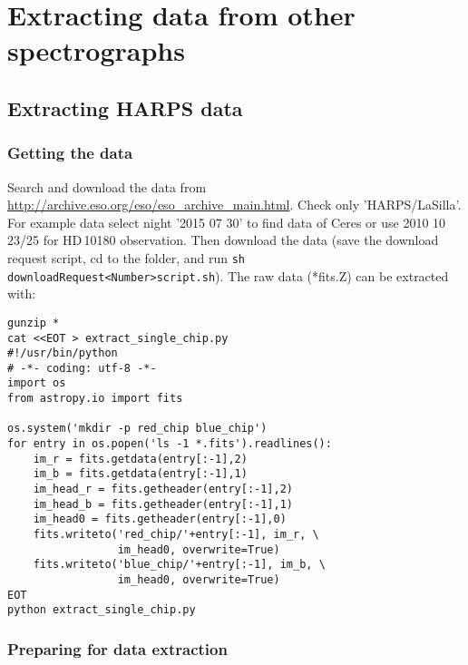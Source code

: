 \documentclass[10pt,a4paper]{article}
\begin{document}
\newpage

\section{Extracting data from other spectrographs}

\subsection{Extracting HARPS data}

\subsubsection{Getting the data}
Search and download the data from \url{http://archive.eso.org/eso/eso_archive_main.html}. Check only 'HARPS/LaSilla'. For example data select night '2015 07 30' to find data of Ceres or use 2010 10 23/25 for HD\,10180 observation. Then download the data (save the download request script, cd to the folder, and run \verb|sh  downloadRequest<Number>script.sh|). The raw data (*fits.Z) can be extracted with:
\begin{lstlisting}[style=base]
gunzip *
cat <<EOT > extract_single_chip.py
#!/usr/bin/python
# -*- coding: utf-8 -*-
import os
from astropy.io import fits

os.system('mkdir -p red_chip blue_chip')
for entry in os.popen('ls -1 *.fits').readlines():
    im_r = fits.getdata(entry[:-1],2)
    im_b = fits.getdata(entry[:-1],1)
    im_head_r = fits.getheader(entry[:-1],2)
    im_head_b = fits.getheader(entry[:-1],1)
    im_head0 = fits.getheader(entry[:-1],0)
    fits.writeto('red_chip/'+entry[:-1], im_r, \
                 im_head0, overwrite=True)
    fits.writeto('blue_chip/'+entry[:-1], im_b, \
                 im_head0, overwrite=True)
EOT
python extract_single_chip.py
\end{lstlisting}


\subsubsection{Preparing for data extraction}
\end{document}

